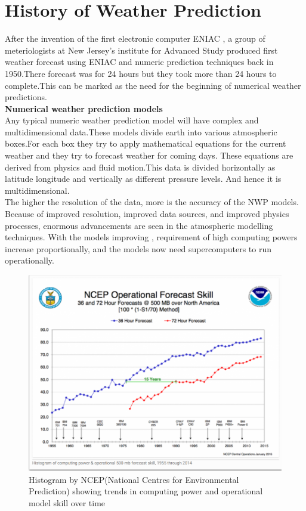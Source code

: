 \documentclass[sigconf]{acmart}
\begin{document}
\section{History of Weather Prediction}


After the invention of the first electronic computer ENIAC , a group of meteriologists at New Jersey's institute for Advanced Study produced first weather forecast using ENIAC and numeric prediction techniques back in 1950.There forecast was for 24 hours but they took more than 24 hours to complete.This can be marked as the need for the beginning of numerical weather predictions.\cite{History01}
\\

\textbf{Numerical weather prediction models}\\


Any typical numeric weather prediction model will have complex and multidimensional data.These models divide earth into various atmospheric boxes.For each box they try to apply mathematical equations for the current weather and they try to forecast weather for coming days. These equations are derived from physics and fluid motion.This data is divided horizontally as latitude longitude and vertically as different pressure levels. And hence it is multidimensional.\\

The higher the resolution of the data, more is the accuracy of the NWP models. Because of improved resolution, improved data sources, and improved physics processes, enormous advancements  are seen in the atmospheric modelling techniques. With the models improving , requirement of high computing powers increase proportionally, and the models now need supercomputers to run operationally.\\


\begin{figure}
\includegraphics{images/Big data image.png}
\caption{Histogram by NCEP(National Centres for Environmental Prediction) showing trends in computing power and operational model skill over time}
\end{figure}
\end{document}
